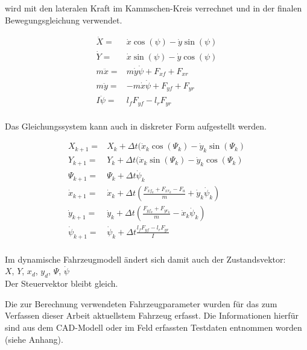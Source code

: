 \documentclass{like}
\begin{document}
wird mit den lateralen Kraft im Kammschen-Kreis verrechnet und in der finalen Bewegungsgleichung verwendet.

\begin{eqnarray}
\dot{X} =& \dot{x} \cos(\psi) - \dot{y} \sin(\psi) \\
\dot{Y} =& \dot{x} \sin(\psi) - \dot{y} \cos(\psi) \\
m \ddot{x} =& m \dot{y} \dot{\psi} + F_{xf} +  F_{xr}\\
m \ddot{y} =& - m \dot{x} \dot{\psi} +  F_{yf} +  F_{yr} \\
I \ddot{\psi} =&  l_f F_{yf} -  l_r F_{yr} \\
\end{eqnarray}

Das Gleichungssystem kann auch in diskreter Form aufgestellt werden.

\begin{eqnarray}
X_{k+1} =& X_k + \Delta t(\dot{x}_k \cos(\Psi_k) - \dot{y}_k \sin(\Psi_k) \\
Y_{k+1} =& Y_{k} + \Delta t(\dot{x}_k \sin(\Psi_k) - \dot{y}_k \cos(\Psi_k) \\
\Psi_{k+1} =& \Psi_k + \Delta t \dot{\psi}_k \\
\dot{x}_{k+1} =&  \dot{x}_k + \Delta t (\frac{F_{xf_k} +  F_{xr_k}- F_a}{m} + \dot{y}_k \dot{\psi}_k) \\
\dot{y}_{k+1} =&  \dot{y}_k + \Delta t (\frac{ F_{yf_k} +  F_{yr_k}}{m} - \dot{x}_k \dot{\psi}_k)  \\
\dot{\psi}_{k+1} =& \dot{\psi}_k + \Delta t \frac{ l_f F_{yf} -  l_r F_{yr}}{I} \\
\end{eqnarray}

Im dynamische Fahrzeugmodell ändert sich damit auch der Zustandsvektor: \\
\(X\), \(Y\), \(x_d\), \(y_d\), \(\Psi\), \(\dot{\psi}\) \\
Der Steuervektor bleibt gleich.

Die zur Berechnung verwendeten Fahrzeugparameter wurden für das zum Verfassen dieser Arbeit aktuellstem Fahrzeug erfasst. Die Informationen hierfür sind aus dem CAD-Modell oder im Feld erfassten Testdaten entnommen worden (siehe Anhang).
\end{document}
